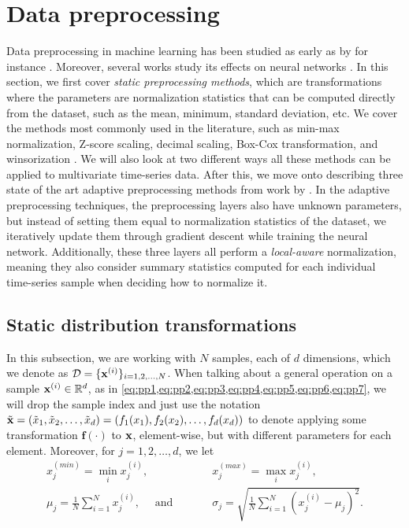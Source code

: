 \documentclass{statsmsc}
\begin{document}
{%

\section{Data preprocessing}%
\label{sec:Data preprocessing}

Data preprocessing in machine learning has been studied as early
as \citeyear{preprocess_origin} by for instance \citeauthor{preprocess_origin}.
Moreover, several works study its effects on neural networks \citep{stanislav, nawi, singh, hassan}.
In this section, we first cover \textit{static preprocessing methods}, which
are transformations where the parameters are normalization statistics that can be
computed directly
from the dataset, such as the mean, minimum, standard deviation, etc.
We cover the methods most commonly used in the literature, such as min-max
normalization, Z-score scaling, decimal scaling, Box-Cox transformation,
and winsorization \citep{stanislav, nawi, singh, hassan, winsorization}.
We will also look at two different ways all these methods can be applied to multivariate
time-series data.
%
After this, we move onto describing three state of the art adaptive
preprocessing methods from work by \cite{dain,rdain,bin}.
In the adaptive preprocessing techniques, the preprocessing layers also have
unknown parameters, but instead of setting them equal to normalization statistics of
the dataset, we iteratively update them through gradient descent while training the
neural network. Additionally, these three layers all
perform a \textit{local-aware} normalization, meaning they also consider
summary statistics computed for each individual time-series sample when
deciding how to normalize it.

\subsection{Static distribution transformations}%
\label{sub:Static distribution transformations}

In this subsection, we are working with $N$ samples, each of $d$ dimensions, which we
denote as $\mathcal{D}=\{\mathbf{x}^{(i)} \}_{i=1,2,\dots,N}$. When talking about a general operation
on a sample $\mathbf{x}^{(i)}\in\mathbb{R}^d$, as in \cref{eq:pp1,eq:pp2,eq:pp3,eq:pp4,eq:pp5,eq:pp6,eq:pp7},
we will drop the sample index and just use the notation
$\tilde{\mathbf{x}}=\left(\tilde{x}_1,\tilde{x}_2,\dots,\tilde{x}_d \right)
=(f_1(x_1), f_2(x_2),\dots,f_d(x_d))$ to denote applying some transformation $\mathbf{f}(\cdot)$ to
$\mathbf{x}$, element-wise, but with different parameters for each element.
Moreover, for $j=1,2,\dots,d$, we let
\begin{align}
    x_j^{(min)}=\min_i x^{(i)}_j,  \qquad\qquad&\quad
    x_j^{(max)}=\max_i x^{(i)}_j, \nonumber\\
    \mu_j = \frac{1}{N} \sum^{N}_{i=1} x^{(i)}_j, \quad
    \textrm{ and }&\quad
    \sigma_j = \sqrt{\frac{1}{N} \sum^{N}_{i=1} \left( x^{(i)}_j - \mu_j\right)^2}.
\end{align}

}
\end{document}
